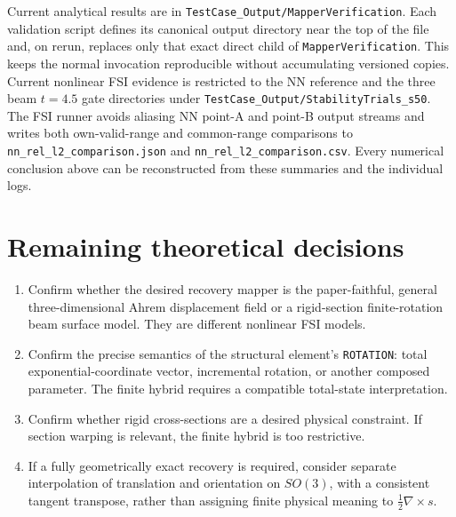 \documentclass[11pt,a4paper]{article}
\newcommand{\curl}{\nabla\times}
\begin{document}
Current analytical results are in
\texttt{TestCase\_Output/MapperVerification}.  Each validation script defines
its canonical output directory near the top of the file and, on rerun,
replaces only that exact direct child of \texttt{MapperVerification}.  This
keeps the normal invocation reproducible without accumulating versioned
copies.  Current nonlinear FSI evidence is restricted to the NN reference and
the three beam \(t=4.5\) gate directories under
\texttt{TestCase\_Output/StabilityTrials\_s50}.  The FSI runner avoids
aliasing NN point-A and point-B output streams and writes both own-valid-range
and common-range comparisons to
\texttt{nn\_rel\_l2\_comparison.json} and
\texttt{nn\_rel\_l2\_comparison.csv}.  Every numerical conclusion above can
be reconstructed from these summaries and the individual logs.

\section{Remaining theoretical decisions}

\begin{enumerate}
\item Confirm whether the desired recovery mapper is the paper-faithful,
      general three-dimensional Ahrem displacement field or a rigid-section
      finite-rotation beam surface model.  They are different nonlinear FSI
      models.
\item Confirm the precise semantics of the structural element's
      \texttt{ROTATION}: total exponential-coordinate vector, incremental
      rotation, or another composed parameter.  The finite hybrid requires a
      compatible total-state interpretation.
\item Confirm whether rigid cross-sections are a desired physical constraint.
      If section warping is relevant, the finite hybrid is too restrictive.
\item If a fully geometrically exact recovery is required, consider separate
      interpolation of translation and orientation on \(SO(3)\), with a
      consistent tangent transpose, rather than assigning finite physical
      meaning to \(\tfrac12\curl s\).
\end{enumerate}
\end{document}
